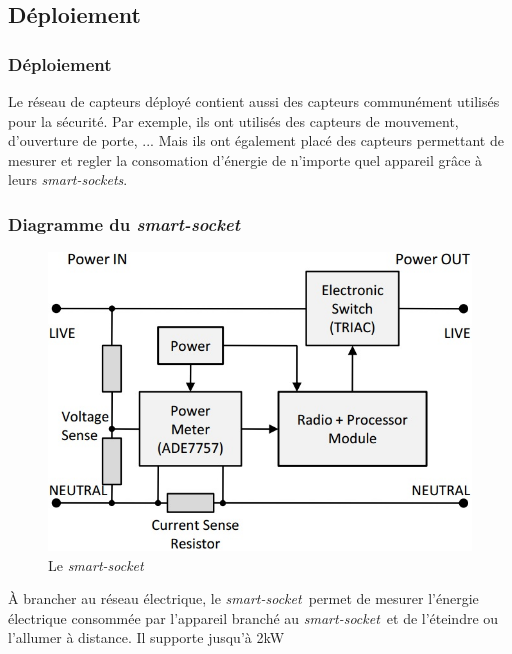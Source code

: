 
\subsection{Déploiement}
\begin{frame}
 \frametitle{Déploiement}
 Le réseau de capteurs déployé contient aussi des capteurs communément utilisés pour la sécurité.
 Par exemple, ils ont utilisés des capteurs de mouvement, d'ouverture de porte, ...
 Mais ils ont également placé des capteurs permettant de mesurer et regler la consomation d'énergie de n'importe quel appareil grâce à leurs \textit{smart-sockets}.
\end{frame}

\newcommand{\smartsocket}{\textit{smart-socket}~}
\begin{frame}
 \frametitle{Diagramme du \smartsocket}
 \begin{figure}
  \centering
  \includegraphics[scale=0.35]{figures/smartsocket.jpg}
  \caption{Le \smartsocket}
 \end{figure} 
 À brancher au réseau électrique, le \smartsocket permet de mesurer l'énergie électrique consommée par l'appareil branché au \smartsocket et de l'éteindre ou l'allumer à distance.
 Il supporte jusqu'à 2kW\\
\end{frame}

